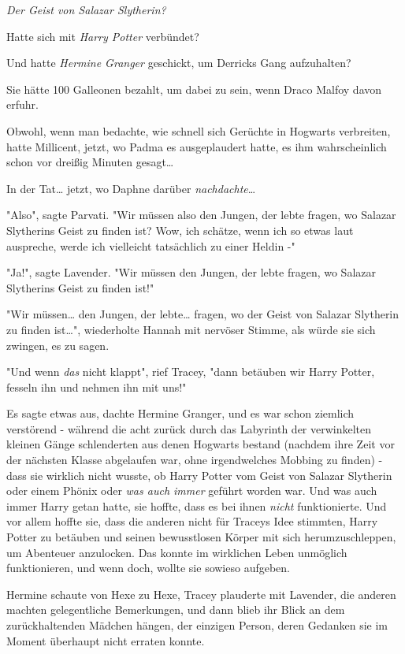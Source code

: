{\emph{\emph{Der Geist von Salazar Slytherin?}}

Hatte sich mit \emph{Harry Potter} verbündet?

Und hatte \emph{Hermine Granger} geschickt, um Derricks Gang aufzuhalten?

Sie hätte 100 Galleonen bezahlt, um dabei zu sein, wenn Draco Malfoy davon erfuhr.

Obwohl, wenn man bedachte, wie schnell sich Gerüchte in Hogwarts verbreiten, hatte Millicent, jetzt, wo Padma es ausgeplaudert hatte, es ihm wahrscheinlich schon vor dreißig Minuten gesagt…

In der Tat… jetzt, wo Daphne darüber \emph{nachdachte}…

"Also", sagte Parvati. "Wir müssen also den Jungen, der lebte fragen, wo Salazar Slytherins Geist zu finden ist? Wow, ich schätze, wenn ich so etwas laut auspreche, werde ich vielleicht tatsächlich zu einer Heldin -"

"Ja!", sagte Lavender. "Wir müssen den Jungen, der lebte fragen, wo Salazar Slytherins Geist zu finden ist!"

"Wir müssen… den Jungen, der lebte… fragen, wo der Geist von Salazar Slytherin zu finden ist…", wiederholte Hannah mit nervöser Stimme, als würde sie sich zwingen, es zu sagen.

"Und wenn \emph{das} nicht klappt", rief Tracey, "dann betäuben wir Harry Potter, fesseln ihn und nehmen ihn mit uns!"

Es sagte etwas aus, dachte Hermine Granger, und es war schon ziemlich verstörend - während die acht zurück durch das Labyrinth der verwinkelten kleinen Gänge schlenderten aus denen Hogwarts bestand (nachdem ihre Zeit vor der nächsten Klasse abgelaufen war, ohne irgendwelches Mobbing zu finden) - dass sie wirklich nicht wusste, ob Harry Potter vom Geist von Salazar Slytherin oder einem Phönix oder \emph{was auch immer} geführt worden war. Und was auch immer Harry getan hatte, sie hoffte, dass es bei ihnen \emph{nicht} funktionierte. Und vor allem hoffte sie, dass die anderen nicht für Traceys Idee stimmten, Harry Potter zu betäuben und seinen bewusstlosen Körper mit sich herumzuschleppen, um Abenteuer anzulocken. Das konnte im wirklichen Leben unmöglich funktionieren, und wenn doch, wollte sie sowieso aufgeben.

Hermine schaute von Hexe zu Hexe, Tracey plauderte mit Lavender, die anderen machten gelegentliche Bemerkungen, und dann blieb ihr Blick an dem zurückhaltenden Mädchen hängen, der einzigen Person, deren Gedanken sie im Moment überhaupt nicht erraten konnte.

}
